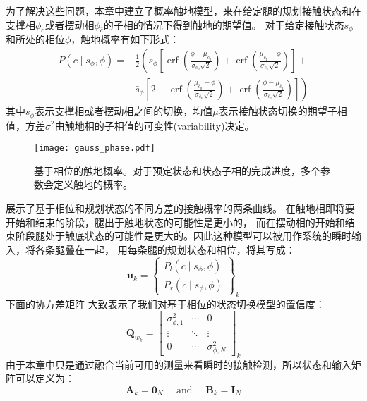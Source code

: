 为了解决这些问题，本章中建立了概率触地模型，来在给定腿的规划接触状态和在支撑相$\phi_c$或者摆动相$\phi_{\bar c}$的子相的情况下得到触地的期望值。
对于给定接触状态$s_{\phi}$和所处的相位$\phi$，触地概率有如下形式：
\begin{equation}
    \label{equ:est_contact_prob}
    \begin{aligned}
        P\left(c \mid s_\phi, \phi\right)= & \frac{1}{2}\left(s_\phi\left[\operatorname{erf}\left(\frac{\phi-\mu_{c_0}}{\sigma_{c_0} \sqrt{2}}\right)+\operatorname{erf}\left(\frac{\mu_{c_1}-\phi}{\sigma_{c_1} \sqrt{2}}\right)\right]+\right. \\
        & \left.\bar{s}_\phi\left[2+\operatorname{erf}\left(\frac{\mu_{\bar{c}_0}-\phi}{\sigma_{\bar{c}_0} \sqrt{2}}\right)+\operatorname{erf}\left(\frac{\phi-\mu_{\bar{c}_1}}{\sigma_{\bar{c}_1} \sqrt{2}}\right)\right]\right)
        \end{aligned}
\end{equation}
其中$s_{\phi}$表示支撑相或者摆动相之间的切换，均值$\mu$表示接触状态切换的期望子相值，方差$\sigma^2$由触地相的子相值的可变性(variability)决定。
\begin{figure}[htbp]
    \centering
    \texttt{[image: gauss\_phase.pdf]}
    \caption{\label{fig:gauss_phase}基于相位的触地概率。对于预定状态和状态子相的完成进度，多个参数会定义触地的概率。}
\end{figure}
展示了基于相位和规划状态的不同方差的接触概率的两条曲线。
在触地相即将要开始和结束的阶段，腿出于触地状态的可能性是更小的，
而在摆动相的开始和结束阶段腿处于触底状态的可能性是更大的。因此这种模型可以被用作系统的瞬时输入，将各条腿叠在一起，
用每条腿的规划状态和相位，将其写成：
\begin{equation}
    \label{equ:est_input}
    \boldsymbol{u}_k=\left\{\begin{array}{c}
        P_l\left(c \mid s_\phi, \phi\right) \\
        P_r\left(c \mid s_\phi, \phi\right)
        \end{array}\right\}_k
\end{equation}
下面的协方差矩阵 大致表示了我们对基于相位的状态切换模型的置信度：
\begin{equation}
    \label{equ:est_process_noise}
    \boldsymbol{Q}_{w_k}=\left[\begin{array}{ccc}
        \sigma_{\phi, 1}^2 & \cdots & 0 \\
        \vdots & \ddots & \vdots \\
        0 & \cdots & \sigma_{\phi, N}^2
        \end{array}\right]_k
\end{equation}
由于本章中只是通过融合当前可用的测量来看瞬时的接触检测，所以状态和输入矩阵可以定义为：
\begin{equation}
    \label{equ:est_process_matrix}
    \boldsymbol{A}_k=\mathbf{0}_N \quad \text { and } \quad \boldsymbol{B}_k=\mathbf{I}_N
\end{equation}
